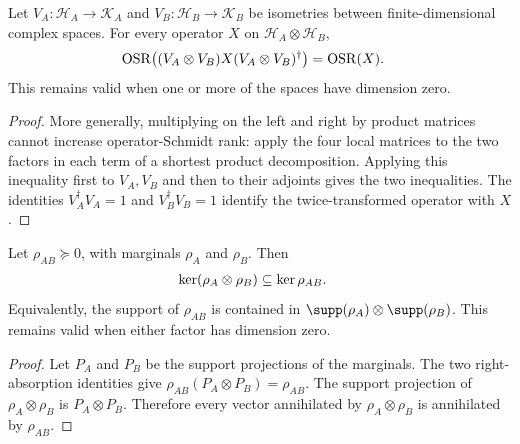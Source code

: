 \begin{theorem}
    \label{thm:operator_schmidt_rank_local_isometry}
    \leanok

    Let $V_A:\mathcal H_A\to\mathcal K_A$ and
    $V_B:\mathcal H_B\to\mathcal K_B$ be isometries between finite-dimensional
    complex spaces. For every operator $X$ on
    $\mathcal H_A\otimes\mathcal H_B$,
    \begin{align}
        \operatorname{OSR}\!\left(
        (V_A\otimes V_B)X(V_A\otimes V_B)^\dagger\right)
         & =\operatorname{OSR}(X).
        \notag
    \end{align}
    This remains valid when one or more of the spaces have dimension zero.
\end{theorem}
\begin{proof}\leanok
    More generally, multiplying on the left and right by product matrices
    cannot increase operator-Schmidt rank: apply the four local matrices to
    the two factors in each term of a shortest product decomposition. Applying
    this inequality first to $V_A,V_B$ and then to their adjoints gives the two
    inequalities. The identities $V_A^\dagger V_A=1$ and
    $V_B^\dagger V_B=1$ identify the twice-transformed operator with $X$.
\end{proof}

\begin{theorem}
    \label{thm:product_marginals_kernel}
    \leanok
    Let $\rho_{AB}\succeq0$, with marginals $\rho_A$ and $\rho_B$. Then
    \begin{align}
        \ker(\rho_A\otimes\rho_B) & \subseteq\ker\rho_{AB}.
        \notag
    \end{align}
    Equivalently, the support of $\rho_{AB}$ is contained in
    $\supp(\rho_A)\otimes\supp(\rho_B)$. This remains valid when either
    factor has dimension zero.
\end{theorem}

\begin{proof}\leanok
    Let $P_A$ and $P_B$ be the support projections of the marginals. The two
    right-absorption identities give
    $\rho_{AB}(P_A\otimes P_B)=\rho_{AB}$. The support projection of
    $\rho_A\otimes\rho_B$ is $P_A\otimes P_B$. Therefore every vector
    annihilated by $\rho_A\otimes\rho_B$ is annihilated by $\rho_{AB}$.
\end{proof}

